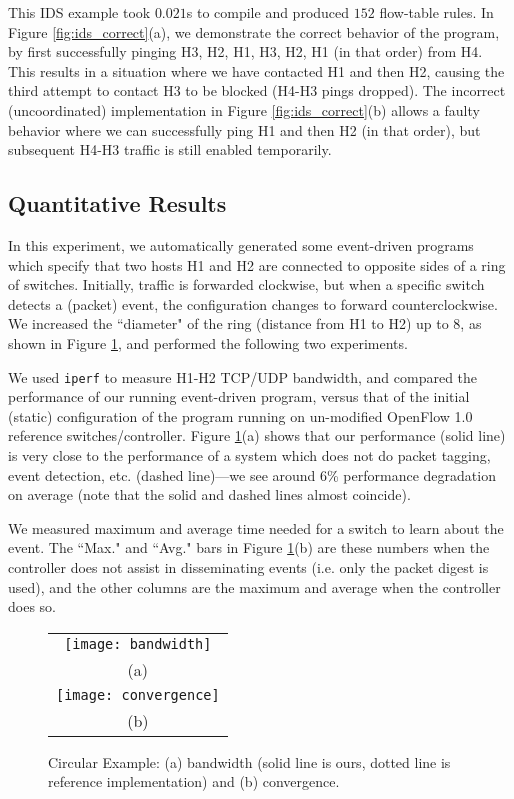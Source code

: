 \documentclass[pldi-cameraready]{sigplanconf}
\begin{document}
This IDS example took $0.021$s to compile and produced $152$ flow-table rules.
In Figure \ref{fig:ids_correct}(a), we demonstrate the correct behavior of the
program, by first successfully pinging H3, H2, H1, H3, H2, H1 (in that order) from H4.
This results in a situation where we have contacted H1 and then H2, causing the third attempt to
contact H3 to be blocked (H4-H3 pings dropped).
The incorrect (uncoordinated) implementation in Figure \ref{fig:ids_correct}(b) allows a faulty
behavior where we can successfully ping H1 and then H2 (in that order), but subsequent H4-H3 traffic is
still enabled temporarily.


\subsection{Quantitative Results}

In this experiment, we automatically generated some event-driven programs which specify
that two hosts H1 and H2 are connected to opposite sides of a ring of switches. Initially,
traffic is forwarded clockwise, but when a specific switch detects a (packet) event, the
configuration changes to forward counterclockwise.
We increased the ``diameter" of the ring (distance from H1 to H2) up to 8, as shown in
Figure \ref{fig:bandwidth}, and performed the following two experiments.
\begin{compactenum}
\item We used {\tt iperf} to measure H1-H2 TCP/UDP bandwidth, and compared the
performance of our running event-driven program, versus that of the initial (static)
configuration of the program running on un-modified OpenFlow 1.0 reference
switches/controller. Figure \ref{fig:bandwidth}(a) shows that our performance
(solid line) is very close to the performance of a system which does not do packet tagging, event
detection, etc. (dashed line)---we see around 6\% performance degradation on average (note
that the solid and dashed lines almost coincide).
\item We measured maximum and average time needed for a switch to learn about the event.
The ``Max." and ``Avg." bars in Figure \ref{fig:bandwidth}(b) are these numbers when the
controller does not assist in disseminating events (i.e. only the packet digest is used),
and the other columns are the maximum and average when the controller does so.
\end{compactenum}

\begin{figure}
\centering
\bgroup
\def\arraystretch{0.5}
\begin{tabular}{c}
\texttt{[image: bandwidth]} \\
{\scriptsize (a)} \\
\texttt{[image: convergence]} \\
{\scriptsize (b)}
\end{tabular}
\egroup
\caption{Circular Example: (a) bandwidth (solid line is ours, dotted line is reference implementation)
and (b) convergence.}
\label{fig:bandwidth}
\end{figure}
\end{document}
